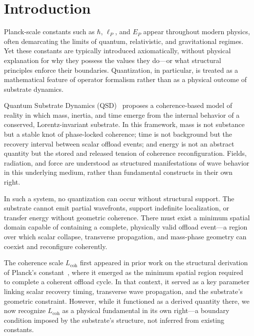 \documentclass[entropy,article,submit,pdftex,oneauthor]{Definitions/mdpi}
\begin{document}

\section{Introduction}

Planck-scale constants such as \texorpdfstring{\( \hbar \)}{hbar}, \texorpdfstring{\( \ell_P \)}{lP}, and \texorpdfstring{\( E_P \)}{EP} appear throughout modern physics, often demarcating the limits of quantum, relativistic, and gravitational regimes. Yet these constants are typically introduced axiomatically, without physical explanation for why they possess the values they do---or what structural principles enforce their boundaries. Quantization, in particular, is treated as a mathematical feature of operator formalism rather than as a physical outcome of substrate dynamics.

Quantum Substrate Dynamics (QSD)~\cite{bush2025} proposes a coherence-based model of reality in which mass, inertia, and time emerge from the internal behavior of a conserved, Lorentz-invariant substrate. In this framework, mass is not substance but a stable knot of phase-locked coherence; time is not background but the recovery interval between scalar offload events; and energy is not an abstract quantity but the stored and released tension of coherence reconfiguration. Fields, radiation, and force are understood as structured manifestations of wave behavior in this underlying medium, rather than fundamental constructs in their own right.

In such a system, no quantization can occur without structural support. The substrate cannot emit partial wavefronts, support indefinite localization, or transfer energy without geometric coherence. There must exist a minimum spatial domain capable of containing a complete, physically valid offload event---a region over which scalar collapse, transverse propagation, and mass-phase geometry can coexist and reconfigure coherently.

The coherence scale \texorpdfstring{\( L_{\text{coh}} \)}{Lcoh} first appeared in prior work on the structural derivation of Planck’s constant~\cite{bush-planck-2025}, where it emerged as the minimum spatial region required to complete a coherent offload cycle. In that context, it served as a key parameter linking scalar recovery timing, transverse wave propagation, and the substrate’s geometric constraint. However, while it functioned as a derived quantity there, we now recognize \texorpdfstring{\( L_{\text{coh}} \)}{Lcoh} as a physical fundamental in its own right---a boundary condition imposed by the substrate’s structure, not inferred from existing constants.
\end{document}
